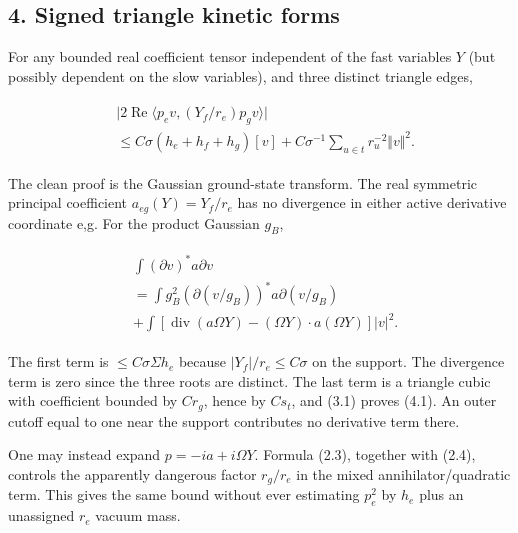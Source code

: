 \subsection{4. Signed triangle kinetic
forms}\label{h-signed-triangle-kinetic-forms}

For any bounded real coefficient tensor independent of the fast
variables \(Y\) (but possibly dependent on the slow variables), and
three distinct triangle edges,

\begin{gather*}
\begin{aligned}
& \vert 2\operatorname{Re} \langle p_{e} v, (Y_{f}/r_{e})p_{g} v\rangle \vert \\
& \le C \sigma  (h_{e}+h_{f}+h_{g})[v]+C \sigma ^{-1} \sum _{u \in  t}r_{u}^{-2}\Vert v\Vert ^{2}.
\end{aligned}\tag{4.1}
\end{gather*}

The clean proof is the Gaussian ground-state transform. The real
symmetric principal coefficient \(a_{eg}(Y)=Y_{f}/r_{e}\) has no
divergence in either active derivative coordinate e,g. For the product
Gaussian \(g_{B}\),

\begin{gather*}
\begin{aligned}
& \int  ( \partial  v)^{*}a \partial  v \\
& = \int  g_{B}^{2}( \partial  (v/g_{B}))^{*}a \partial  (v/g_{B}) \\
& + \int  [\operatorname{div} (a \Omega  Y)-( \Omega  Y) \cdot  a( \Omega  Y)]\vert v\vert ^{2}.
\end{aligned}\tag{4.2}
\end{gather*}

The first term is \(\le C \sigma  \Sigma  h_{e}\) because
\(\vert Y_{f}\vert /r_{e}\le C \sigma\) on the support. The divergence
term is zero since the three roots are distinct. The last term is a
triangle cubic with coefficient bounded by \(C r_{g}\), hence by
\(C s_{t}\), and (3.1) proves (4.1). An outer cutoff equal to one near
the support contributes no derivative term there.

One may instead expand \(p=-i a+i \Omega  Y\). Formula (2.3), together
with (2.4), controls the apparently dangerous factor \(r_{g}/r_{e}\) in
the mixed annihilator/quadratic term. This gives the same bound without
ever estimating \(p_{e}^{2}\) by \(h_{e}\) plus an unassigned \(r_{e}\)
vacuum mass.

